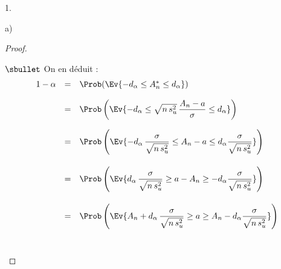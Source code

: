 \begin{noliste}{1.}
\begin{noliste}{a)}
\begin{proof}
\begin{noliste}{$\sbullet$}
    On en déduit :
    \[
     \begin{array}{rcl}
      1-\alpha &=& \Prob(\Ev{-d_\alpha \leq A_n^* \leq d_\alpha})
      \\[.4cm]
      &=& \Prob\left(\Ev{-d_\alpha \leq \sqrt{n \, s_u^2} \, \dfrac{A_n 
      - a}{\sigma} \leq d_\alpha}\right)
      \\[.6cm]
      &=& \Prob\left(\Ev{ -d_\alpha \, 
      \dfrac{\sigma}{\sqrt{n \, s_u^2}} \leq A_n -a \leq d_\alpha
      \dfrac{\sigma}{\sqrt{n \, s_u^2}}}\right)
      \\[.8cm]
      &=& \Prob\left(\Ev{ d_\alpha \, 
      \dfrac{\sigma}{\sqrt{n \, s_u^2}} \geq a -A_n \geq -d_\alpha
      \dfrac{\sigma}{\sqrt{n \, s_u^2}}}\right)
      \\[.8cm]
      &=& \Prob\left(\Ev{A_n + d_\alpha \, 
      \dfrac{\sigma}{\sqrt{n \, s_u^2}} \geq a \geq A_n -d_\alpha
      \dfrac{\sigma}{\sqrt{n \, s_u^2}}}\right)
     \end{array}
    \]
    ~\\[-1.4cm]
   \end{noliste}
  \end{proof}
 \end{noliste}
\end{noliste}








